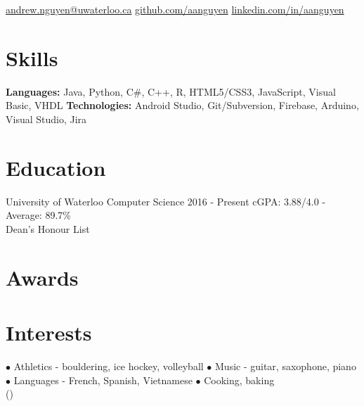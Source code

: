 \documentclass[]{aanguyen_res}
\begin{document}
	\begin{sidebar}%
		\vspace{35pt}%
			\iconentry{\faEnvelope}\href{mailto:andrew.nguyen@uwaterloo.ca}{andrew.nguyen@uwaterloo.ca}
			\iconentry{\faGithub}\href{http://github.com/aanguyen}{github.com/aanguyen}
			\iconentry{\faLinkedin}\href{http://www.linkedin.com/in/aanguyen}{linkedin.com/in/aanguyen}
			\vspace{0.75cm}%
		\section{Skills}
			\textbf{Languages: }Java, Python, C\#, C++, R, HTML5/CSS3, JavaScript, Visual Basic, VHDL
			\vspace{0.15cm}%
			\textbf{Technologies: }Android Studio, Git/Subversion, Firebase, Arduino, Visual Studio, Jira
			\vspace{1cm}%
		\section{Education}
			\eduentry%
				{University of Waterloo}%
				{Computer Science}%
				{2016 - Present}%
				{cGPA: 3.88/4.0 - Average: 89.7\% \\Dean's Honour List}
			\vspace{0.65cm}%
		\section{Awards}
			\vspace{0.65cm}%
		\section{Interests}
		$\bullet$ Athletics - bouldering, ice hockey, volleyball
		$\bullet$ Music - guitar, saxophone, piano
		$\bullet$ Languages - French, Spanish, Vietnamese
		$\bullet$ Cooking, baking\\()
	\end{sidebar}%
\end{document}
